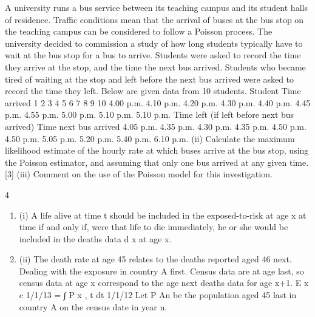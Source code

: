 \documentclass[a4paper,12pt]{article}
\begin{document}
\begin{enumerate}
A university runs a bus service between its teaching campus and its student halls of
residence. Traffic conditions mean that the arrival of buses at the bus stop on the
teaching campus can be considered to follow a Poisson process.
The university decided to commission a study of how long students typically have to
wait at the bus stop for a bus to arrive. Students were asked to record the time they
arrive at the stop, and the time the next bus arrived. Students who became tired of
waiting at the stop and left before the next bus arrived were asked to record the time
they left. Below are given data from 10 students.
Student Time arrived
1
2
3
4
5
6
7
8
9
10 4.00 p.m.
4.10 p.m.
4.20 p.m.
4.30 p.m.
4.40 p.m.
4.45 p.m.
4.55 p.m.
5.00 p.m.
5.10 p.m.
5.10 p.m.
Time left (if
left before
next bus
arrived)
Time next
bus arrived
4.05 p.m.
4.35 p.m.
4.30 p.m.
4.35 p.m.
4.50 p.m.
4.50 p.m.
5.05 p.m.
5.20 p.m.
5.40 p.m.
6.10 p.m.
(ii) Calculate the maximum likelihood estimate of the hourly rate at which buses
arrive at the bus stop, using the Poisson estimator, and assuming that only one
bus arrived at any given time.
[3]
(iii) Comment on the use of the Poisson model for this investigation.


\newpage

4

\begin{enumerate}
\item (i) A life alive at time t should be included in the exposed-to-risk at age x at time
if and only if, were that life to die immediately, he or she would be included
in the deaths data d x at age x.
\item (ii) The death rate at age 45 relates to the deaths reported aged 46 next.
Dealing with the exposure in country A first. Census data are at age last, so
census data at age x correspond to the age next deaths data for age x+1.
E x c
1/1/13
=
∫
P x , t dt
1/1/12
Let P An be the population aged 45 last in country A on the census date in
year n.
\end{enumerate}


\end{enumerate}
\end{document}
